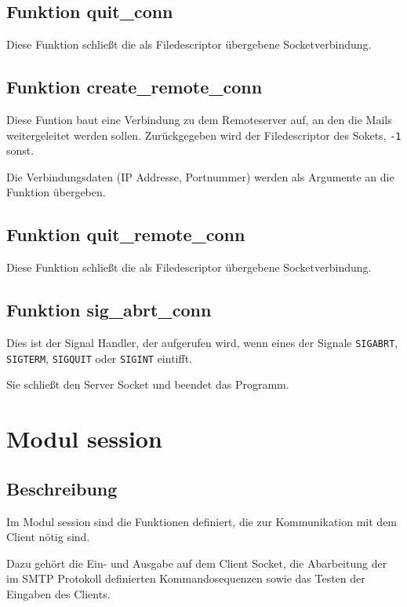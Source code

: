 \documentclass[pdftex,final,a4paper,10pt,notitlepage,halfparskip]{scrreprt}
\begin{document}
\subsection{Funktion quit\_conn}\label{fn:quit_conn}
Diese Funktion schließt die als Filedescriptor übergebene Socketverbindung.


\subsection{Funktion create\_remote\_conn}\label{fn:create_remote_conn}
Diese Funtion baut eine Verbindung zu dem Remoteserver auf, an den die Mails weitergeleitet werden sollen. Zurückgegeben wird der Filedescriptor des Sokets, \texttt{-1} sonst.

Die Verbindungsdaten (IP Addresse, Portnummer) werden als Argumente an die Funktion übergeben.

\subsection{Funktion quit\_remote\_conn}\label{fn:quit_remote_conn}
Diese Funktion schließt die als Filedescriptor übergebene Socketverbindung.

\subsection{Funktion sig\_abrt\_conn}\label{fn:sig_abrt_conn}
Dies ist der Signal Handler, der aufgerufen wird, wenn eines der Signale \texttt{SIGABRT}, \texttt{SIGTERM}, \texttt{SIGQUIT} oder \texttt{SIGINT} eintifft. 

Sie schließt den Server Socket und beendet das Programm.





\section{Modul session}\label{mod:session}
\subsection{Beschreibung}
Im Modul session sind die Funktionen definiert, die zur Kommunikation mit dem Client nötig sind. 

Dazu gehört die Ein- und Ausgabe auf dem Client Socket, die Abarbeitung der im SMTP Protokoll definierten Kommandosequenzen sowie das Testen der Eingaben des Clients.
\end{document}
